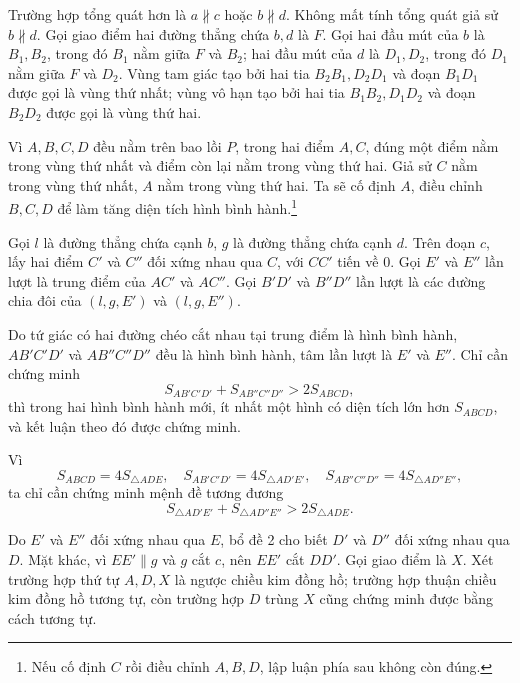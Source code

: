 \documentclass[11pt]{article}
\newcommand{\area}[1]{S_{#1}}
\begin{document}
Trường hợp tổng quát hơn là \(a\not\parallel c\) hoặc \(b\not\parallel d\).
Không mất tính tổng quát giả sử \(b\not\parallel d\). Gọi giao điểm hai đường
thẳng chứa \(b,d\) là \(F\). Gọi hai đầu mút của \(b\) là \(B_1,B_2\), trong
đó \(B_1\) nằm giữa \(F\) và \(B_2\); hai đầu mút của \(d\) là \(D_1,D_2\),
trong đó \(D_1\) nằm giữa \(F\) và \(D_2\). Vùng tam giác tạo bởi hai tia
\(B_2B_1,D_2D_1\) và đoạn \(B_1D_1\) được gọi là vùng thứ nhất; vùng vô hạn
tạo bởi hai tia \(B_1B_2,D_1D_2\) và đoạn \(B_2D_2\) được gọi là vùng thứ hai.

Vì \(A,B,C,D\) đều nằm trên bao lồi \(P\), trong hai điểm \(A,C\), đúng một
điểm nằm trong vùng thứ nhất và điểm còn lại nằm trong vùng thứ hai. Giả sử
\(C\) nằm trong vùng thứ nhất, \(A\) nằm trong vùng thứ hai. Ta sẽ cố định
\(A\), điều chỉnh \(B,C,D\) để làm tăng diện tích hình bình hành.\footnote{Nếu
cố định \(C\) rồi điều chỉnh \(A,B,D\), lập luận phía sau không còn đúng.}

Gọi \(l\) là đường thẳng chứa cạnh \(b\), \(g\) là đường thẳng chứa cạnh
\(d\). Trên đoạn \(c\), lấy hai điểm \(C'\) và \(C''\) đối xứng nhau qua
\(C\), với \(CC'\) tiến về \(0\). Gọi \(E'\) và \(E''\) lần lượt là trung điểm
của \(AC'\) và \(AC''\). Gọi \(B'D'\) và \(B''D''\) lần lượt là các đường
chia đôi của \((l,g,E')\) và \((l,g,E'')\).

Do tứ giác có hai đường chéo cắt nhau tại trung điểm là hình bình hành,
\(AB'C'D'\) và \(AB''C''D''\) đều là hình bình hành, tâm lần lượt là \(E'\) và
\(E''\). Chỉ cần chứng minh
\[
  \area{AB'C'D'}+\area{AB''C''D''}>2\area{ABCD},
\]
thì trong hai hình bình hành mới, ít nhất một hình có diện tích lớn hơn
\(\area{ABCD}\), và kết luận theo đó được chứng minh.

Vì
\[
  \area{ABCD}=4\area{\triangle ADE},\quad
  \area{AB'C'D'}=4\area{\triangle AD'E'},\quad
  \area{AB''C''D''}=4\area{\triangle AD''E''},
\]
ta chỉ cần chứng minh mệnh đề tương đương
\[
  \area{\triangle AD'E'}+\area{\triangle AD''E''}>
  2\area{\triangle ADE}.
\]

Do \(E'\) và \(E''\) đối xứng nhau qua \(E\), bổ đề 2 cho biết \(D'\) và
\(D''\) đối xứng nhau qua \(D\). Mặt khác, vì \(EE'\parallel g\) và \(g\) cắt
\(c\), nên \(EE'\) cắt \(DD'\). Gọi giao điểm là \(X\). Xét trường hợp thứ tự
\(A,D,X\) là ngược chiều kim đồng hồ; trường hợp thuận chiều kim đồng hồ tương
tự, còn trường hợp \(D\) trùng \(X\) cũng chứng minh được bằng cách tương tự.
\end{document}
